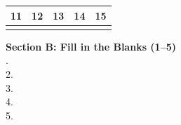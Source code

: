 \documentclass{CWNUExam}
\begin{document}
\begin{tabular}{|c|c|c|c|c|}
\hline
11 & 12 & 13 & 14 & 15 \\
\hline
\underline{\hspace{1.6cm}} & \underline{\hspace{1.6cm}} & \underline{\hspace{1.6cm}} & \underline{\hspace{1.6cm}} & \underline{\hspace{1.6cm}}  \\
\hline
\end{tabular}

\vspace{0.8cm}
\noindent\textbf{Section B: Fill in the Blanks (1--5)}\\[0.2cm]
.\ \underline{\hspace{17cm}}\\[0.4cm]
2.\ \underline{\hspace{17cm}}\\[0.4cm]
3.\ \underline{\hspace{17cm}}\\[0.4cm]
4.\ \underline{\hspace{17cm}}\\[0.4cm]
5.\ \underline{\hspace{17cm}}\\[0.4cm]
\end{document}
